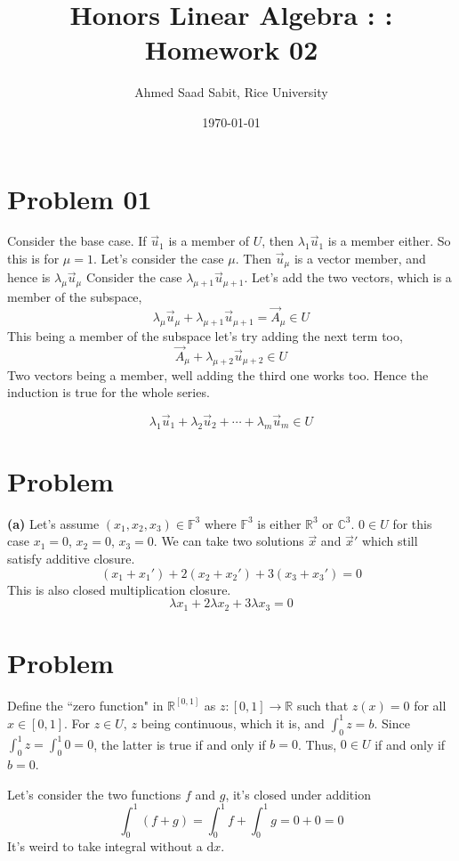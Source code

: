 \documentclass[letter]{article}
\title{Honors Linear Algebra : : Homework 02}
\author{Ahmed Saad Sabit, Rice University}
\date{\today}
\begin{document}
\maketitle 

\section{Problem 01} 
Consider the base case. If $\vec{u}_1$ is a member of $U$, then $\lambda_1 \vec{u}_1$ is a member either. So this is for $\mu = 1$. Let's consider the case $\mu$. Then $\vec{u}_\mu$ is a vector member, and hence is $\lambda_\mu \vec{u}_\mu$ Consider the case $\lambda_{\mu + 1} \vec{u}_{\mu+1}$. Let's add the two vectors, which is a member of the subspace, 
\[
	\lambda_\mu \vec{u}_\mu + \lambda_{\mu+1}\vec{u}_{\mu+1} = \vec{A}_\mu \in U
\]
This being a member of the subspace let's try adding the next term too, 
\[
	\vec{A}_\mu + \lambda_{\mu+2} \vec{u}_{\mu+2}  \in U
\] 
Two vectors being a member, well adding the third one works too. Hence the induction is true for the whole series. 

\[
\lambda_1 \vec{u}_1 + \lambda_2 \vec{u}_2 + \cdots + \lambda_m \vec{u}_m \in  U
\] 

\section{Problem} 
\textbf{(a)}
Let's assume $(x_1, x_2,x_3) \in \mathbb{F}^{3}$ where $\mathbb{F}^{3}$ is either $\mathbb{R}^{3}$ or $\mathbb{C}^{3}$. 
$0 \in U$ for this case $x_1 = 0$, $x_2=0$, $x_3=0$. We can take two solutions $\vec{x}$ and $\vec{x}'$ which still satisfy additive closure. 
\[
	(x_1 + x_1') + 2 (x_2 + x_2') + 3(x_3 + x_3') = 0
\] 
This is also closed multiplication closure. 
\[
\lambda x_1 + 2 \lambda x_2 + 3 \lambda x_3 = 0
\]

\section{Problem}
Define the ``zero function" in $\mathbb{R}^{[0,1]}$ as $z:[0,1]\rightarrow\mathbb{R}$ such that $z(x)=0$ for all $ x\in[0,1]$. 
For $z\in U$, $z$ being continuous, which it is, and $\int_0^1z=b$. Since $\int_0^1z=\int_0^1 0=0$, the latter is true if and only if $b=0$. Thus, $0\in U$ if and only if $b=0$.

Let's consider the two functions $f$ and $g$, it's closed under addition
\[ \int_0^1(f+g)=\int_0^1f+\int_0^1g=0+0=0 \]
It's weird to take integral without a $\mathrm{d}  x$. 
\end{document}
